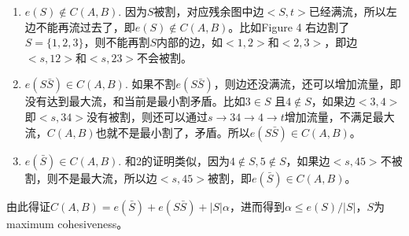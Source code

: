 \documentclass[a4paper,12pt]{article}
\begin{document}
\begin{enumerate}
  \item $e(S)\notin C(A,B)$. 因为$S$被割，对应残余图中边$<S,t>$已经满流，所以左边不能再流过去了，即$e(S)\notin C(A,B)$。比如Figure 4 右边割了$S=\{1,2,3\}$，则不能再割$S$内部的边，如$<1,2>$和$<2,3>$，即边$<s,12>$和$<s,23>$不会被割。
  \item $e(S\bar S)\in C(A,B)$. 如果不割$e(S\bar S)$，则边还没满流，还可以增加流量，即没有达到最大流，和当前是最小割矛盾。比如$3\in S$ 且$4\notin S$，如果边$<3,4>$即$<s,34>$没有被割，则还可以通过$s\rightarrow 34\rightarrow 4\rightarrow t$增加流量，不满足最大流，$C(A,B)$也就不是最小割了，矛盾。所以$e(S\bar S)\in C(A,B)$。
  \item $e(\bar S)\in C(A,B)$. 和2的证明类似，因为$4\notin S,5\notin S$，如果边$<s,45>$不被割，则不是最大流，所以边$<s,45>$被割，即$e(\bar S)\in C(A,B)$。
\end{enumerate}

由此得证$C(A,B)=e(\bar S)+e(S\bar S)+|S|\alpha$，进而得到$\alpha\leq e(S)/|S|$，$S$为maximum cohesiveness。
\end{document}
